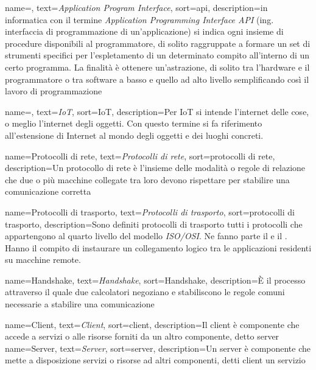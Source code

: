  {
    name=,
    text=\emph{Application Program Interface},
    sort=api,
    description={in informatica con il termine \emph{Application Programming Interface API} (ing. interfaccia di programmazione di un'applicazione) si indica ogni insieme di procedure disponibili al programmatore, di solito raggruppate a formare un set di strumenti specifici per l'espletamento di un determinato compito all'interno di un certo programma. La finalità è ottenere un'astrazione, di solito tra l'hardware e il programmatore o tra software a basso e quello ad alto livello semplificando così il lavoro di programmazione}
}

 {
    name=,
    text=\emph{IoT},
    sort=IoT,
    description={Per IoT si intende l'internet delle cose, o meglio l'internet degli oggetti. Con questo termine si fa riferimento all'estensione di Internet al mondo degli oggetti e dei luoghi concreti. }
}

 {
    name=Protocolli di rete,
    text=\emph{Protocolli di rete},
    sort=protocolli di rete,
    description={Un protocollo di rete è l'insieme delle modalità o regole di relazione che due o più macchine collegate tra loro devono rispettare per stabilire una comunicazione corretta}
}

 {
    name=Protocolli di trasporto,
    text=\emph{Protocolli di trasporto},
    sort=protocolli di trasporto,
    description={Sono definiti protocolli di trasporto tutti i protocolli che appartengono al quarto livello del modello \emph{\gls{ISO/OSI}}. Ne fanno parte il  e il . Hanno il compito di instaurare un collegamento logico tra le applicazioni residenti su macchine remote. }
}

 {
    name=Handshake,
    text=\emph{Handshake},
    sort=Handshake,
    description={È il processo attraverso il quale due calcolatori negoziano e stabiliscono le regole comuni necessarie a stabilire una comunicazione}
}

 {
    name=Client,
    text=\emph{Client},
    sort=client,
    description={Il client è componente che accede a servizi o alle risorse forniti da un altro componente, detto \gls{server} }
}
 {
    name=Server,
    text=\emph{Server},
    sort=server,
    description={Un server è componente che mette a disposizione servizi o risorse ad altri componenti, detti \gls{client} un servizio}
}

